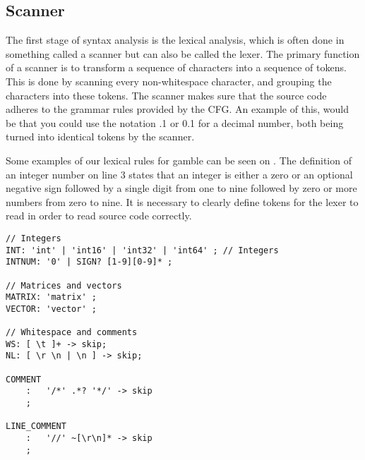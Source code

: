 \subsection*{Scanner}
The first stage of syntax analysis is the lexical analysis, which is often done in something called a scanner but can also be called the lexer.
The primary function of a scanner is to transform a sequence of characters into a sequence of tokens.
This is done by scanning every non-whitespace character, and grouping the characters into these tokens.
The scanner makes sure that the source code adheres to the grammar rules provided by the CFG.
An example of this, would be that you could use the notation .1 or 0.1 for a decimal number, both being turned into identical tokens by the scanner.

Some examples of our lexical rules for \gls{gamble} can be seen on .
The definition of an integer number on line 3 states that an integer is either a zero or an optional negative sign followed by a single digit from one to nine followed by zero or more numbers from zero to nine.
It is necessary to clearly define tokens for the lexer to read in order to read source code correctly. \citep{Crafting_book}

\begin{lstlisting}[caption=Example of our lexer rules for \gls{gamble},frame=tlrb,label={lst:token}]
// Integers
INT: 'int' | 'int16' | 'int32' | 'int64' ; // Integers
INTNUM: '0' | SIGN? [1-9][0-9]* ;

// Matrices and vectors
MATRIX: 'matrix' ;
VECTOR: 'vector' ;

// Whitespace and comments
WS: [ \t ]+ -> skip;
NL: [ \r \n | \n ] -> skip;

COMMENT
    :   '/*' .*? '*/' -> skip
    ;

LINE_COMMENT
    :   '//' ~[\r\n]* -> skip
    ;
\end{lstlisting} 